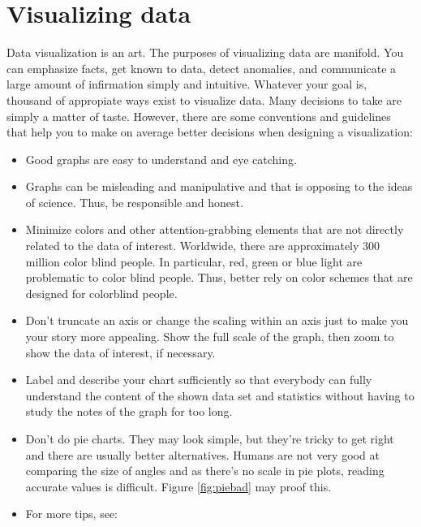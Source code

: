 \documentclass[
  12pt,
  oneside]{book}
\providecommand{\tightlist}{%
  \setlength{\itemsep}{0pt}\setlength{\parskip}{0pt}}
\theoremstyle{definition}
\theoremstyle{definition}
\theoremstyle{definition}
\theoremstyle{definition}
\theoremstyle{remark}
\begin{document}
\hypertarget{visualizing-data}{%
\chapter{Visualizing data}\label{visualizing-data}}

Data visualization is an art. The purposes of visualizing data are manifold. You can emphasize facts, get known to data, detect anomalies, and communicate a large amount of infirmation simply and intuitive. Whatever your goal is, thousand of appropiate ways exist to visualize data. Many decisions to take are simply a matter of taste. However, there are some conventions and guidelines that help you to make on average better decisions when designing a visualization:

\begin{itemize}
\tightlist
\item
  Good graphs are easy to understand and eye catching.
\item
  Graphs can be misleading and manipulative and that is opposing to the ideas of science. Thus, be responsible and honest.
\item
  Minimize colors and other attention-grabbing elements that are not directly related to the data of interest. Worldwide, there are approximately 300 million color blind people. In particular, red, green or blue light are problematic to color blind people. Thus, better rely on color schemes that are designed for colorblind people.
\item
  Don't truncate an axis or change the scaling within an axis just to make you your story more appealing. Show the full scale of the graph, then zoom to show the data of interest, if necessary.
\item
  Label and describe your chart sufficiently so that everybody can fully understand the content of the shown data set and statistics without having to study the notes of the graph for too long.
\item
  Don't do pie charts. They may look simple, but they're tricky to get right and there are usually better alternatives. Humans are not very good at comparing the size of angles and as there's no scale in pie plots, reading accurate values is difficult. Figure \ref{fig:piebad} may proof this.
\item
  For more tips, see:


\end{itemize}
\end{document}
